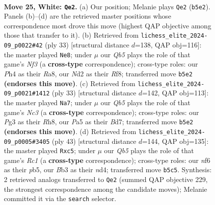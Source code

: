 \documentclass[11pt]{article}
\begin{document}
\begin{figure}[p]\centering
\begin{subfigure}{0.46\textwidth}\centering
\resizebox{\linewidth}{!}{%
\newchessgame
\chessboard[
  setfen={rnb4b/pp2qp1k/3rpnp1/PQ1p3p/3P3P/1B2B1P1/RPPN1P2/1N2R1K1 w - - 3 25},
  showmover=false,
  pgfstyle=straightmove, color=movearrow, markmove={b5-e2}
]}
\caption{}
\end{subfigure}\hfill
\begin{subfigure}{0.46\textwidth}\centering
\resizebox{\linewidth}{!}{%
\newchessgame
\chessboard[
  setfen={r1bq1rk1/1pp3bp/5np1/p1pPp3/2P1PpP1/2NB1N1P/PPQ2P2/R3K2R b KQ - 2 17},
  showmover=false,
  pgfstyle=straightmove, color=movearrow, markmove={f6-e8}
]}
\caption{}
\end{subfigure}
\\[4pt]
\begin{subfigure}{0.46\textwidth}\centering
\resizebox{\linewidth}{!}{%
\newchessgame
\chessboard[
  setfen={2r1k2r/1pqbbpp1/p1n1p1p1/3pP3/PP6/2P2NB1/5PPP/RN1QR1K1 b k - 9 17},
  showmover=false,
  pgfstyle=straightmove, color=movearrow, markmove={c6-a7}
]}
\caption{}
\end{subfigure}\hfill
\begin{subfigure}{0.46\textwidth}\centering
\resizebox{\linewidth}{!}{%
\newchessgame
\chessboard[
  setfen={2r1r1k1/1p3ppp/4p1b1/pPPp2q1/P2N3n/2P1PP2/3QBRPP/2R3K1 b - - 4 22},
  showmover=false,
  pgfstyle=straightmove, color=movearrow, markmove={c8-c5}
]}
\caption{}
\end{subfigure}
\caption{\textbf{Move 25, White: \texttt{Qe2}.} (a) Our position; Melanie plays \texttt{Qe2} (\texttt{b5e2}). Panels (b)--(d) are the retrieved master positions whose correspondence most drove this move (highest QAP objective among those that transfer to it). (b) Retrieved from \texttt{lichess\_elite\_2024-09\_p0022\#42} (ply 33) [structural distance $d$=138, QAP obj=116]: the master played \texttt{Ne8}; under $\mu$ our \emph{Qb5} plays the role of that game's \emph{Nf3} (a \textbf{cross-type} correspondence); cross-type roles: our \emph{P}h4 as their \emph{R}a8, our \emph{N}d2 as their \emph{R}f8; transferred move \texttt{b5e2} \textbf{(endorses this move)}. (c) Retrieved from \texttt{lichess\_elite\_2024-09\_p0021\#1412} (ply 33) [structural distance $d$=142, QAP obj=113]: the master played \texttt{Na7}; under $\mu$ our \emph{Qb5} plays the role of that game's \emph{Nc3} (a \textbf{cross-type} correspondence); cross-type roles: our \emph{P}g3 as their \emph{R}h8, our \emph{P}a5 as their \emph{B}d7; transferred move \texttt{b5e2} \textbf{(endorses this move)}. (d) Retrieved from \texttt{lichess\_elite\_2024-09\_p0005\#3405} (ply 43) [structural distance $d$=144, QAP obj=135]: the master played \texttt{Rxc5}; under $\mu$ our \emph{Qb5} plays the role of that game's \emph{Rc1} (a \textbf{cross-type} correspondence); cross-type roles: our \emph{n}f6 as their \emph{p}b5, our \emph{B}b3 as their \emph{n}d4; transferred move \texttt{b5c5}. Synthesis: 2 retrieved analogs transferred to \texttt{Qe2} (summed QAP objective 229, the strongest correspondence among the candidate moves); Melanie committed it via the \texttt{search} selector.}
\label{fig:thought-m48}
\end{figure}
\end{document}
